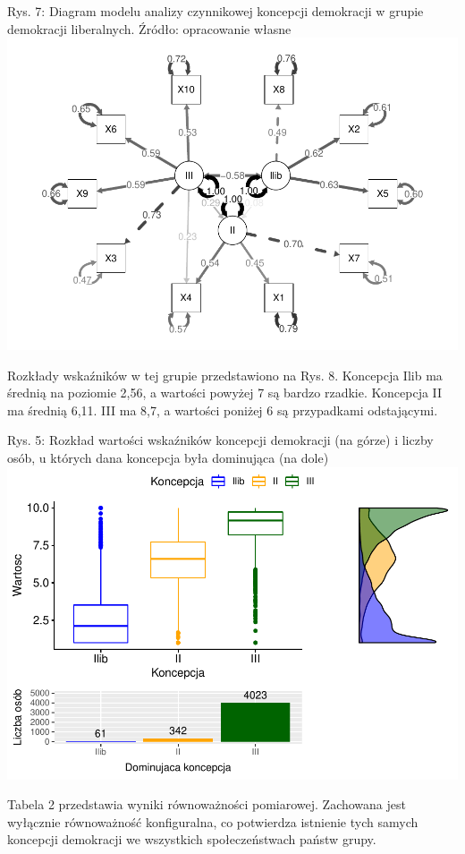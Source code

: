 \documentclass[12pt]{article}
\begin{document}
Rys. 7: Diagram modelu analizy czynnikowej koncepcji demokracji w grupie demokracji liberalnych. Źródło: opracowanie własne
\includegraphics{text_ASA_files/figure-latex/diagram-west-1.pdf}

Rozkłady wskaźników w tej grupie przedstawiono na Rys. 8. Koncepcja Ilib ma średnią na poziomie 2,56, a wartości powyżej 7 są bardzo rzadkie. Koncepcja II ma średnią 6,11. III ma 8,7, a wartości poniżej 6 są przypadkami odstającymi.

Rys. 5: Rozkład wartości wskaźników koncepcji demokracji (na górze) i liczby osób, u których dana koncepcja była dominująca (na dole)
\includegraphics{text_ASA_files/figure-latex/stats-west-1.pdf}

Tabela 2 przedstawia wyniki równoważności pomiarowej. Zachowana jest wyłącznie równoważność konfiguralna, co potwierdza istnienie tych samych koncepcji demokracji we wszystkich społeczeństwach państw grupy.
\end{document}
